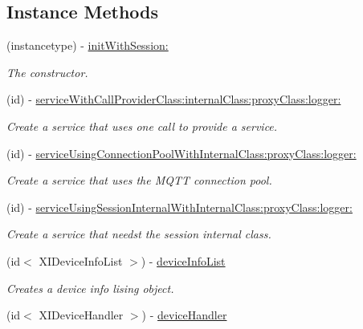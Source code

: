 \subsection*{Instance Methods}
\begin{DoxyCompactItemize}
\item 
(instancetype) -\/ \hyperlink{interface_x_i_session_services_internal_a8496751bb3437da322555a3fb702f246}{init\+With\+Session\+:}
\begin{DoxyCompactList}\small\item\em The constructor. \end{DoxyCompactList}\item 
(id) -\/ \hyperlink{interface_x_i_session_services_internal_ace1d15a61962e552cb13f7bf10d1e56e}{service\+With\+Call\+Provider\+Class\+:internal\+Class\+:proxy\+Class\+:logger\+:}
\begin{DoxyCompactList}\small\item\em Create a service that uses one call to provide a service. \end{DoxyCompactList}\item 
(id) -\/ \hyperlink{interface_x_i_session_services_internal_ae7d776f871143a3001d9f24fa1ca27cd}{service\+Using\+Connection\+Pool\+With\+Internal\+Class\+:proxy\+Class\+:logger\+:}
\begin{DoxyCompactList}\small\item\em Create a service that uses the M\+Q\+TT connection pool. \end{DoxyCompactList}\item 
(id) -\/ \hyperlink{interface_x_i_session_services_internal_acb1dd120832c6c6b19d63ac706222f03}{service\+Using\+Session\+Internal\+With\+Internal\+Class\+:proxy\+Class\+:logger\+:}
\begin{DoxyCompactList}\small\item\em Create a service that needst the session internal class. \end{DoxyCompactList}\item 
(id$<$ X\+I\+Device\+Info\+List $>$) -\/ \hyperlink{interface_x_i_session_services_internal_a9189da286adb396ae6bf4adce6d76291}{device\+Info\+List}
\begin{DoxyCompactList}\small\item\em Creates a device info lising object. \end{DoxyCompactList}\item 
(id$<$ X\+I\+Device\+Handler $>$) -\/ \hyperlink{interface_x_i_session_services_internal_a2873e657d72e56d7d0f0b5e0f0e6e241}{device\+Handler}

\end{DoxyCompactItemize}

